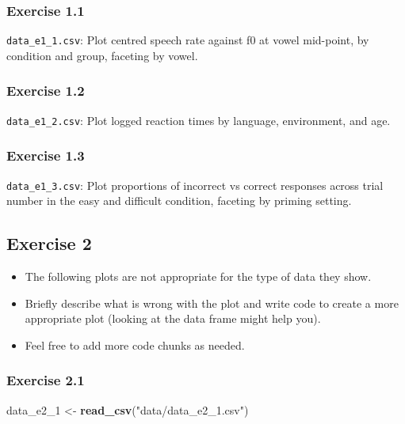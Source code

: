 \documentclass[
]{article}
\newenvironment{Shaded}{\begin{snugshade}}{\end{snugshade}}
\newcommand{\FunctionTok}[1]{\textcolor[rgb]{0.13,0.29,0.53}{\textbf{#1}}}
\newcommand{\NormalTok}[1]{#1}
\newcommand{\OtherTok}[1]{\textcolor[rgb]{0.56,0.35,0.01}{#1}}
\newcommand{\StringTok}[1]{\textcolor[rgb]{0.31,0.60,0.02}{#1}}
\providecommand{\tightlist}{%
  \setlength{\itemsep}{0pt}\setlength{\parskip}{0pt}}
\begin{document}
\hypertarget{exercise-1.1}{%
\subsubsection{Exercise 1.1}\label{exercise-1.1}}

\texttt{data\_e1\_1.csv}: Plot centred speech rate against f0 at vowel
mid-point, by condition and group, faceting by vowel.

\hypertarget{exercise-1.2}{%
\subsubsection{Exercise 1.2}\label{exercise-1.2}}

\texttt{data\_e1\_2.csv}: Plot logged reaction times by language,
environment, and age.

\hypertarget{exercise-1.3}{%
\subsubsection{Exercise 1.3}\label{exercise-1.3}}

\texttt{data\_e1\_3.csv}: Plot proportions of incorrect vs correct
responses across trial number in the easy and difficult condition,
faceting by priming setting.

\hypertarget{exercise-2}{%
\subsection{Exercise 2}\label{exercise-2}}

\begin{itemize}
\tightlist
\item
  The following plots are not appropriate for the type of data they
  show.
\item
  Briefly describe what is wrong with the plot and write code to create
  a more appropriate plot (looking at the data frame might help you).
\item
  Feel free to add more code chunks as needed.
\end{itemize}

\hypertarget{exercise-2.1}{%
\subsubsection{Exercise 2.1}\label{exercise-2.1}}

\begin{Shaded}
\begin{Highlighting}[]
\NormalTok{data\_e2\_1 }\OtherTok{\textless{}{-}} \FunctionTok{read\_csv}\NormalTok{(}\StringTok{"data/data\_e2\_1.csv"}\NormalTok{)}
\end{Highlighting}
\end{Shaded}
\end{document}
